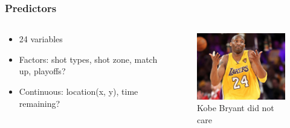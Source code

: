 \documentclass{beamer}
\begin{document}
\frame
{
  	\frametitle{Predictors}
	\begin{columns}
		\begin{column}{0.5\textwidth}
			\begin{itemize}
				\item {24 variables}
				\item{Factors: shot types, shot zone, match up, playoffs?}
				\item{Continuous: location(x, y),  time remaining?}
			\end{itemize}

		\end{column}
  		\begin{column}{0.5\textwidth}
			\begin{figure}
    				\begin{center}
        					\includegraphics[width=160pt]{figure/Kobe_3.png}
        					\caption{Kobe Bryant did not care}
       					\label{}
    				\end{center}
			\end{figure}
		\end{column}
	\end{columns}
}

\end{document}
